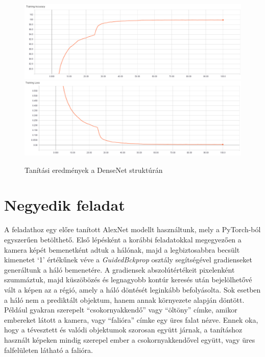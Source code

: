 \begin{figure}[!h]
	\centering
	\includegraphics[width=140mm, keepaspectratio]{figures/m07/dn_train_acc.jpg}\\\vspace{5mm}
	\includegraphics[width=140mm, keepaspectratio]{figures/m07/dn_train_loss.jpg}
	\caption{Tanítási eredmények a DenseNet struktúrán}
	\label{fig:TrainDense}
\end{figure}
\section{Negyedik feladat}
A feladathoz egy előre tanított AlexNet modellt használtunk, mely a PyTorch-ból egyszerűen betölthető. Első lépésként a korábbi feladatokkal megegyezően a kamera képét bemenetként adtuk a hálónak, majd a legbiztosabbra becsült kimenetet ‘1’ értékűnek véve a \textit{GuidedBckprop} osztály segítségével gradienseket generáltunk a háló bemenetére.
A gradiensek abszolútértékeit pixelenként szummáztuk, majd küszöbözés és legnagyobb kontúr keresés után bejelölhetővé vált a képen az a régió, amely a háló döntését leginkább befolyásolta.
Sok esetben a háló nem a prediktált objektum, hanem annak környezete alapján döntött. Például gyakran szerepelt “csokornyakkendő” vagy “öltöny” címke, amikor embereket látott a kamera, vagy “falióra” címke egy üres falat nézve. Ennek oka, hogy a tévesztett és valódi objektumok szorosan együtt járnak, a tanításhoz használt képeken mindig szerepel ember a csokornyakkendővel együtt, vagy üres falfelületen látható a falióra.



